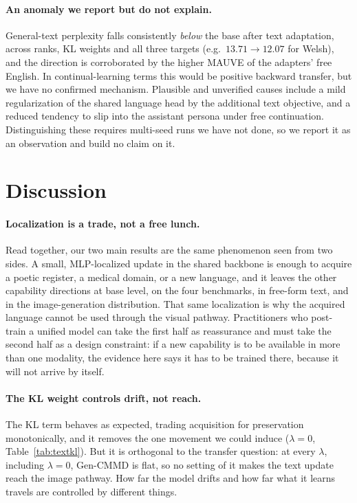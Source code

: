 \documentclass{article}
\begin{document}
\paragraph{An anomaly we report but do not explain.}
General-text perplexity falls consistently \emph{below} the base after text
adaptation, across ranks, KL weights and all three targets (e.g.\
$13.71\to12.07$ for Welsh), and the direction is corroborated by the higher
MAUVE of the adapters' free English. In continual-learning terms this would be
positive backward transfer, but we have no confirmed mechanism. Plausible and
unverified causes include a mild regularization of the shared language head by
the additional text objective, and a reduced tendency to slip into the assistant
persona under free continuation. Distinguishing these requires multi-seed runs
we have not done, so we report it as an observation and build no claim on it.

\section{Discussion}
\paragraph{Localization is a trade, not a free lunch.}
Read together, our two main results are the same phenomenon seen from two sides.
A small, MLP-localized update in the shared backbone is enough to acquire a
poetic register, a medical domain, or a new language, and it leaves the other
capability directions at base level, on the four benchmarks, in free-form text,
and in the image-generation distribution. That same localization is why the
acquired language cannot be used through the visual pathway. Practitioners who
post-train a unified model can take the first half as reassurance and must take
the second half as a design constraint: if a new capability is to be available in
more than one modality, the evidence here says it has to be trained there,
because it will not arrive by itself.

\paragraph{The KL weight controls drift, not reach.}
The KL term behaves as expected, trading acquisition for preservation
monotonically, and it removes the one movement we could induce ($\lambda=0$,
Table~\ref{tab:textkl}). But it is orthogonal to the transfer question: at every
$\lambda$, including $\lambda=0$, Gen-CMMD is flat, so no setting of it makes the
text update reach the image pathway. How far the model drifts and how far what it
learns travels are controlled by different things.
\end{document}
